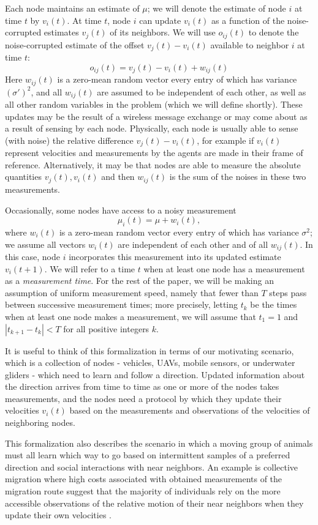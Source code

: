 \documentclass[final]{siamltex}
\begin{document}
Each node maintains an estimate of $\mu$; we will denote the estimate of  node $i$ at time $t$ by $v_i(t)$. At time $t$, node $i$ can update $v_i(t)$ as a function of the noise-corrupted estimates $v_j(t)$ of its neighbors. We will use $o_{ij}(t)$ to denote the noise-corrupted estimate of the offset $v_j(t)-v_i(t)$ available to neighbor $i$ at time $t$: \[ o_{ij}(t) = v_j(t) - v_i(t) + w_{ij}(t) \] Here $w_{ij}(t)$ is a zero-mean random vector every entry of which has variance $(\sigma')^2$, and all $w_{ij}(t)$ are assumed to be independent of each other, as well as all other
random variables in the problem (which we will define shortly). These updates may be the result of a wireless message exchange or may come about as a result of sensing by each node. Physically, each node is usually able to  sense  (with noise) the relative difference $v_j(t) - v_i(t)$, for example if $v_i(t)$ represent 
velocities and measurements by the agents are made in their frame of reference. Alternatively, it may be that nodes are able to measure the absolute 
quantities $v_j(t), v_i(t)$ and then $w_{ij}(t)$ is the sum of the noises in these two measurements.  

 Occasionally, some nodes have access to a noisy measurement \[ \mu_i(t) = \mu + w_i(t),\] where $w_i(t)$ is a zero-mean random vector every entry of which has variance $\sigma^2$; we assume all vectors $w_i(t)$ are independent of each other and of all $w_{ij}(t)$. In this case, node $i$ incorporates this measurement into its updated estimate $v_i(t+1)$. We will refer to a time $t$ when at least one node has a measurement as a {\em measurement time}. For the rest of the paper, we will be making an assumption of uniform measurement speed, namely that fewer than $T$ steps pass between successive measurement times; more precisely, letting $t_k$ be the times when at least one node makes a measurement, we will assume that $t_1 = 1$ and $|t_{k+1} - t_k|  < T$ for all positive integers $k$. 

It is useful to think of this formalization in terms of our motivating scenario, which is a collection of nodes - vehicles, UAVs, mobile 
sensors, or underwater gliders - which need to learn and follow a direction. Updated information about the direction arrives from time to time as one or more of the nodes takes measurements, and the nodes need a protocol by which they update their velocities $v_i(t)$ based on the measurements and observations of the velocities of neighboring nodes. 

This formalization also describes the scenario in which a moving group of animals  must all learn which way to go based on intermittent samples of a preferred direction and social interactions with near neighbors.  An example is collective migration where high costs associated with obtained measurements of the migration route suggest that the majority of individuals rely on the more accessible observations of the relative motion of their near neighbors when they update their own velocities \cite{gc10}.
\end{document}

